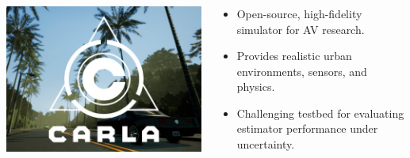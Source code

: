 \documentclass[handout, aspectratio=169]{beamer}
\begin{document}
\begin{frame}
 \frametitle{}    
\begin{columns}[T]    
    \begin{column}{0.45\textwidth}
        \includegraphics[width=\textwidth]{figs/carla.jpg}
    \end{column}
  
    \begin{column}{0.55\textwidth}
        \begin{tcolorbox}[colbacktitle=title1, title=\textbf{Testing in CARLA Simulator}]
          \begin{itemize}
            \item <1-> Open-source, high-fidelity simulator for AV research.
            \item <2-> Provides realistic urban environments, sensors, and physics.
            \item <3-> Challenging testbed for evaluating estimator performance under uncertainty.
        \end{itemize}
    \end{tcolorbox}
    \end{column}

    \end{columns}      
   \end{frame}


\end{document}
